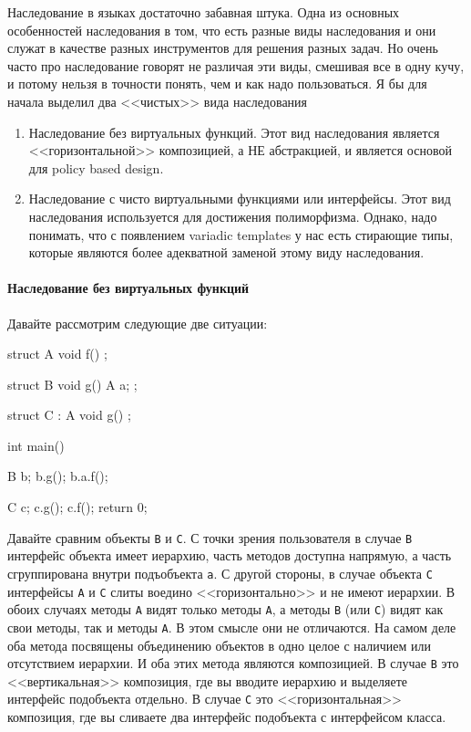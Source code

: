 \documentclass{article}
\begin{document}
Наследование в языках достаточно забавная штука. Одна из основных особенностей наследования в том, что есть разные виды наследования и они служат в качестве разных инструментов для решения разных задач. Но очень часто про наследование говорят не различая эти виды, смешивая все в одну кучу, и потому нельзя в точности понять, чем и как надо пользоваться. Я бы для начала выделил два <<чистых>> вида наследования
\begin{enumerate}
\item Наследование без виртуальных функций. Этот вид наследования является <<горизонтальной>> композицией, а НЕ абстракцией, и является основой для policy based design.

\item Наследование с чисто виртуальными функциями или интерфейсы. Этот вид наследования используется для достижения полиморфизма. Однако, надо понимать, что с появлением variadic templates у нас есть стирающие типы, которые являются более адекватной заменой этому виду наследования.
\end{enumerate}

\paragraph{Наследование без виртуальных функций}

Давайте рассмотрим следующие две ситуации:
\begin{cppcode}
struct A {
  void f() {}
};

struct B {
  void g() {}
  A a;
};

struct C : A {
  void g() {}
};

int main() {
  B b;
  b.g();
  b.a.f();
  
  C c;
  c.g();
  c.f();
  return 0;
}
\end{cppcode}
Давайте сравним объекты \verb"B" и \verb"C". С точки зрения пользователя в случае \verb"B" интерфейс объекта имеет иерархию, часть методов доступна напрямую, а часть сгруппирована внутри подъобъекта \verb"a". С другой стороны, в случае объекта \verb"C" интерфейсы \verb"A" и \verb"C" слиты воедино <<горизонтально>> и не имеют иерархии. В обоих случаях методы \verb"A" видят только методы \verb"A", а методы \verb"B" (или \verb"C") видят как свои методы, так и методы \verb"A". В этом смысле они не отличаются. На самом деле оба метода посвящены объединению объектов в одно целое с наличием или отсутствием иерархии. И оба этих метода являются композицией. В случае \verb"B" это <<вертикальная>> композиция, где вы вводите иерархию и выделяете интерфейс подобъекта отдельно. В случае \verb"C" это <<горизонтальная>> композиция, где вы сливаете два интерфейс подобъекта с интерфейсом класса.
\end{document}
